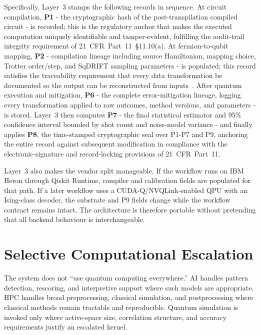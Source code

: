\documentclass[11pt,letterpaper]{article}
\begin{document}
Specifically, Layer~3 stamps the following records in sequence.  At circuit compilation,
\textbf{P1} - the cryptographic hash of the post-transpilation compiled circuit - is
recorded; this is the regulatory anchor that makes the executed computation uniquely
identifiable and tamper-evident, fulfilling the audit-trail integrity requirement of
21~CFR~Part~11~\S{}11.10(a).  At fermion-to-qubit mapping, \textbf{P2} - compilation
lineage including source Hamiltonian, mapping choice, Trotter order/step, and SqDRIFT
sampling parameters - is populated; this record satisfies the traceability requirement
that every data transformation be documented so the output can be reconstructed from
inputs~\cite{fda21cfr11,fda2003guidance}.  After quantum execution and mitigation,
\textbf{P6} - the complete error-mitigation lineage, logging every transformation applied
to raw outcomes, method versions, and parameters - is stored.  Layer~3 then computes
\textbf{P7} - the final statistical estimator and 95\% confidence interval bounded by
shot count and noise-model variance - and finally applies \textbf{P8}, the time-stamped
cryptographic seal over P1-P7 and P9, anchoring the entire record against subsequent
modification in compliance with the electronic-signature and record-locking provisions
of 21~CFR~Part~11.

Layer~3 also makes the vendor split manageable.  If the workflow runs on IBM Heron through
Qiskit Runtime, compiler and calibration fields are populated for that path.  If a later
workflow uses a CUDA-Q/NVQLink-enabled QPU with an Ising-class decoder, the substrate and
P9 fields change while the workflow contract remains intact.  The architecture is therefore
portable without pretending that all backend behaviour is interchangeable.

\section{Selective Computational Escalation}

The system does not ``use quantum computing everywhere.''  AI handles pattern detection,
rescoring, and interpretive support where such models are appropriate.  HPC handles broad
preprocessing, classical simulation, and postprocessing where classical methods remain
tractable and reproducible.  Quantum simulation is invoked only where active-space size,
correlation structure, and accuracy requirements justify an escalated kernel.
\end{document}
